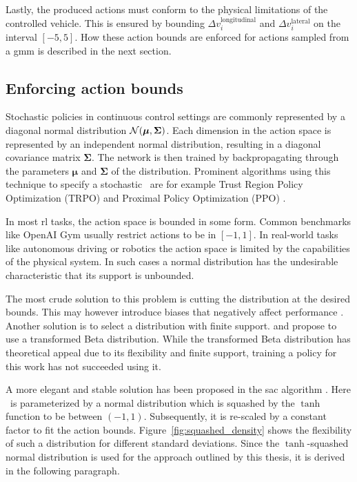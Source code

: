 Lastly, the produced actions must conform to the physical limitations of the controlled vehicle. This is ensured by bounding $\Delta v^{\text{longitudinal}}_i$ and $\Delta v^{\text{lateral}}_i$ on the interval $[-5, 5]$. How these action bounds are enforced for actions sampled from a \gls{gmm} is described in the next section.


\subsection{Enforcing action bounds}\label{ssec:action_bounds}
Stochastic policies in continuous control settings are commonly represented by a diagonal normal distribution $\mathcal{N}( \bm \mu, \bm \Sigma)$. Each dimension in the action space is represented by an independent normal distribution, resulting in a diagonal covariance matrix $\bm \Sigma$. The network is then trained by backpropagating through the parameters $\bm \mu$ and $\bm \Sigma$ of the distribution. Prominent algorithms using this technique to specify a stochastic \p\ are for example Trust Region Policy Optimization (TRPO) \cite{schulmanTrustRegionPolicy2017} and Proximal Policy Optimization (PPO) \cite{schulmanProximalPolicyOptimization2017}.

In most \gls{rl} tasks, the action space is bounded in some form. Common benchmarks like OpenAI Gym \cite{brockmanOpenAIGym2016} usually restrict actions to be in $[-1, 1]$. In real-world tasks like autonomous driving or robotics the action space is limited by the capabilities of the physical system. In such cases a normal distribution has the undesirable characteristic that its support is unbounded.

The most crude solution to this problem is cutting the distribution at the desired bounds. This may however introduce biases that negatively affect performance \cite{chouImprovingStochasticPolicy}. Another solution is to select a distribution with finite support. \cite{chouImprovingStochasticPolicy} and \cite{moerlandA0CAlphaZero2018} propose to use a transformed Beta distribution. While the transformed Beta distribution has theoretical appeal due to its flexibility and finite support, training a policy for this work has not succeeded using it.

A more elegant and stable solution has been proposed in the \gls{sac} algorithm \cite{haarnojaSoftActorCriticAlgorithms2018}. Here \p\ is parameterized by a normal distribution which is squashed by the $\tanh$ function to be between $(-1, 1)$. Subsequently, it is re-scaled by a constant factor to fit the action bounds. Figure~\ref{fig:squashed_density} shows the flexibility of such a distribution for different standard deviations. Since the $\tanh$-squashed normal distribution is used for the approach outlined by this thesis, it is derived in the following paragraph.

